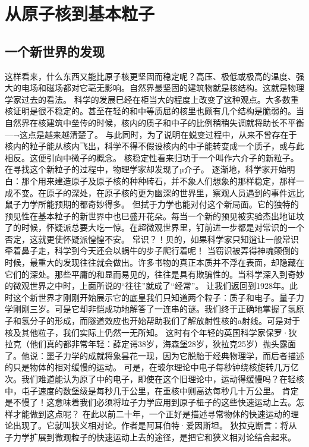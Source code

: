 \chapter{从原子核到基本粒子}

\section{一个新世界的发现}

这样看来，什么东西又能比原子核更坚固而稳定呢？高压、极低或极高的温度、强大的电场和磁场都对它亳无影响。自然界最坚固的建筑物就是核结构。这就是物理学家过去的看法。
科学的发展巳经在柜当大的程度上改变了这种观点。大多数重核证明是很不稳定的。甚至在轻的和中等质屈的核里也颇有几个结构是脆弱的。当自然界在核建筑中垒传的时候，核内的质子和中子的比例稍稍失调就将助长不平衡—¬这点是越来越清楚了。
与此同时，为了说明在蜕变过程中，从来不曾存在于核内的粒子能从核内飞出，科学不得不假设核内的中子能转变成一个质子，或与此相反。这便引向中微子的概念。
核稳定性看来归功于一个叫作六介子的新粒子。在寻找这个新粒子的过程中，物理学家却发现了µ介子。
逐渐地，科学家开始明白：那个用来建造原子及原子核的种种砖石，并不象人们想象的那样稳定，那样一成不变。在原子的深处，在原子核的更为幽深的世界里，察观人员遇到的事件远比鼠子力学所能预期的都奇妙得多。
但拭于力学也能对付这个新局面。它的独特的预见性在基本粒子的新世界中也巳盛开花朵。每当一个新的预见被实验杰出地证坟了的时候，怀疑派总要大吃一惊。在超微观世界里，钉前进一步都是对常识的一个否定，这就更使怀疑派惶惶不安。
常识？！贝的，如果科学家只知逍让一般常识牵着鼻子走，科学到今天还会以蜗牛的步子爬行着呢！
当窃识被弄得神魂颠倒的时候，最重大的发现往往就会做出。许多书物的真正本质并不浮在表面，却隐藏在它们的深处。那些平庸的和显而易见的，往往是具有欺骗性的。当科学深入到奇妙的微观世界之中时，上面所说的“往往”就成了“经常”。
让我们返回到1928年。此时这个新世界才刚刚开始展示它的底皇我们只知道两个粒子：质子和电子。量子力学刚刚三岁。可是它却非恺成功地解答了一连串的谜。我们终于正确地掌握了氢原子和氢分子的形成，而隧道效应也开始帮助我们了解放射性核的a射线。可是对于核及其他粒子，我们实际上仍然一无所知。
这时有个年轻的英国科学家保罗·狄拉克（他们真的都非常年轻：薛定谔38岁，海森堡28岁，狄拉克25岁）抛头露面了。他说：噩子力学的成就将象昙花一现，因为它脱胎于经典物理学，而后者描述的只是物体的相对缓慢的运动。
可是，在玻尔理论中电子每秒钟绕核旋转几万亿次。我们难道能认为原了中的电子，即使在这个旧理论中，运动得缓慢吗？在轻核中，屯子速度的数堡级是每秒几于公里，在重核中则高达每秒几十万公里。
肯定是不慢了！这意味着我们必须将垃子力学应用到原子杻子的这些快速运动上去。怎样才能做到这点呢？
在此以前二十年，一个正好是描述寻常物休的快速运动的理论出现了。它就叫狭义相对论。作者是阿耳伯特·爱因斯坦。
狄拉克断言：将从子力学扩展到微观粒子的快速运动上去的途径，是把它和狭义相对论结合起来。

